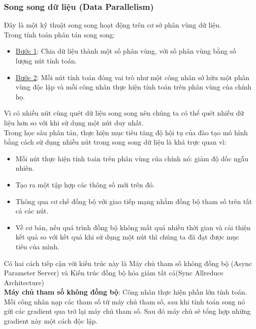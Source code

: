 \documentclass[11pt,a4paper]{article}
\numberwithin{equation}{subsection}
\numberwithin{figure}{subsection}
\numberwithin{table}{subsection}
\begin{document}
\subsubsection{Song song dữ liệu (Data Parallelism)}
 Đây là một kỹ thuật song song hoạt động trên cơ sở phân vùng dữ liệu. \\
 
	Trong tính toán phân tán song song:
	\begin{itemize}
		\item \underline{Bước 1}: Chia dữ liệu thành một số phân vùng, với số phân vùng bằng số lượng nút tính toán.
		\item \underline{Bước 2}: Mỗi nút tính toán đóng vai trò như một công nhân sở hữu một phân vùng độc lập và mỗi công nhân thực hiện tính toán trên phân vùng của chính họ.
	\end{itemize}
	Vì có nhiều nút cùng quét dữ liệu song song nên chúng ta có thể quét nhiều dữ liệu hơn so với khi sử dụng một nút duy nhất.\\
	
	Trong học sâu phân tán, thực hiện mục tiêu tăng độ hội tụ của đào tạo mô hình bằng cách sử dụng nhiều nút trong song song dữ liệu là khá trực quan vì:
	\begin{itemize}
		\item Mỗi nút thực hiện tính toán trên phân vùng của chính nó: giảm độ dốc ngẫu nhiên.
		\item Tạo ra một tập hợp các thông số mới trên đó.
		\item Thông qua cơ chế đồng bộ với giao tiếp mạng nhằm đồng bộ tham số trên tất cả các nút.
		\item Về cơ bản, nếu quá trình đồng bộ không mất quá nhiều thời gian và cải thiện kết quả so với kết quả khi sử dụng một nút thì chúng ta đã đạt được mục tiêu của mình.
	\end{itemize}


Có hai cách tiếp cận với kiến trúc này là Máy chủ tham số không đồng bộ (Async Parameter Server) và  Kiến trúc đồng bộ hóa giảm tất cả(Sync Allreduce Architecture)\\

\textbf{Máy chủ tham số không đồng bộ}:
Công nhân thực hiện phần lớn tính toán. Mỗi công nhân nạp các tham số từ máy chủ tham số, sau khi tính toán song nó gửi các gradient qua trở lại máy chủ tham số. Sau đó máy chủ sẽ tổng hợp những gradient này một cách độc lập. 
\end{document}
